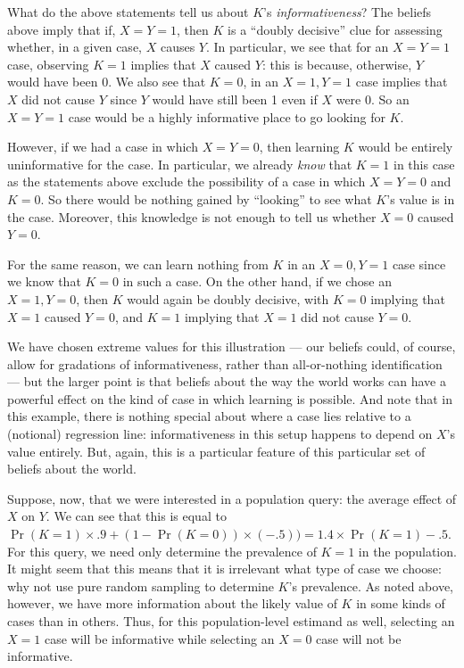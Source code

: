 \documentclass[
  12pt,
]{book}
\begin{document}
What do the above statements tell us about \(K\)'s \emph{informativeness}? The beliefs above imply that if, \(X=Y=1\), then \(K\) is a ``doubly decisive'' clue for assessing whether, in a given case, \(X\) causes \(Y\). In particular, we see that for an \(X=Y=1\) case, observing \(K=1\) implies that \(X\) caused \(Y\): this is because, otherwise, \(Y\) would have been 0. We also see that \(K=0\), in an \(X=1, Y=1\) case implies that \(X\) did not cause \(Y\) since \(Y\) would have still been 1 even if \(X\) were 0. So an \(X=Y=1\) case would be a highly informative place to go looking for \(K\).

However, if we had a case in which \(X=Y=0\), then learning \(K\) would be entirely uninformative for the case. In particular, we already \emph{know} that \(K=1\) in this case as the statements above exclude the possibility of a case in which \(X=Y=0\) and \(K=0\). So there would be nothing gained by ``looking'' to see what \(K\)'s value is in the case. Moreover, this knowledge is not enough to tell us whether \(X=0\) caused \(Y=0\).

For the same reason, we can learn nothing from \(K\) in an \(X=0, Y=1\) case since we know that \(K=0\) in such a case. On the other hand, if we chose an \(X=1, Y=0\), then \(K\) would again be doubly decisive, with \(K=0\) implying that \(X=1\) caused \(Y=0\), and \(K=1\) implying that \(X=1\) did not cause \(Y=0\).

We have chosen extreme values for this illustration --- our beliefs could, of course, allow for gradations of informativeness, rather than all-or-nothing identification --- but the larger point is that beliefs about the way the world works can have a powerful effect on the kind of case in which learning is possible. And note that in this example, there is nothing special about where a case lies relative to a (notional) regression line: informativeness in this setup happens to depend on \(X\)'s value entirely. But, again, this is a particular feature of this particular set of beliefs about the world.

Suppose, now, that we were interested in a population query: the average effect of \(X\) on \(Y\). We can see that this is equal to \(\Pr(K=1)\times.9 + (1-\Pr(K=0))\times(-.5)) = 1.4\times \Pr(K=1)-.5\). For this query, we need only determine the prevalence of \(K=1\) in the population. It might seem that this means that it is irrelevant what type of case we choose: why not use pure random sampling to determine \(K\)'s prevalence. As noted above, however, we have more information about the likely value of \(K\) in some kinds of cases than in others. Thus, for this population-level estimand as well, selecting an \(X=1\) case will be informative while selecting an \(X=0\) case will not be informative.
\end{document}
